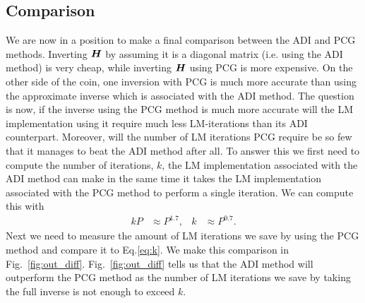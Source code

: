 \documentclass[useAMS,usenatbib]{mn2e}
\newcommand{\bH}{\bmath{H}}
\begin{document}
\subsection{Comparison}
\label{sec:comparison}
We are now in a position to make a final comparison between the ADI and PCG methods. Inverting $\bH$ by assuming it is a diagonal matrix (i.e. using the ADI method) is very cheap, while inverting $\bH$ using PCG is more expensive. On the other side of the coin,  one inversion with PCG is much more 
accurate than using the approximate inverse which is associated with the ADI method. The question is now, if the inverse using the PCG method is much more accurate will the LM implementation using it require much less LM-iterations than its ADI counterpart. Moreover, will the number 
of LM iterations PCG require be so few that it manages to beat the ADI method after all. To answer this we first need to compute the number of iterations, $k$, the LM implementation associated with the ADI method can make in the 
same time it takes the LM implementation associated with the PCG method to perform a single iteration. We can compute this with
\begin{align}
\label{eq:k}
 kP &\approx P^{1.7}, & k &\approx P^{0.7}.
\end{align}
Next we need to measure the amount of LM iterations we save by using the PCG method and compare it to Eq.\eqref{eq:k}. We make this comparison 
in Fig.~\ref{fig:out_diff}. Fig.~\ref{fig:out_diff} tells us that the ADI method will outperform the PCG method as the number of LM iterations we save by taking the 
full inverse is not enough to exceed $k$.
\end{document}
